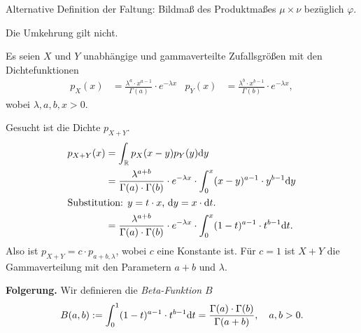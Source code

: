 Alternative Definition der Faltung: Bildmaß des Produktmaßes $\mu \times \nu$
bezüglich $\varphi$.

\begin{rmrk}
  Die Umkehrung gilt nicht.
\end{rmrk}

\begin{exmp}
  Es seien $X$ und $Y$ unabhängige und gammaverteilte Zufallsgrößen mit den
  Dichtefunktionen
  \begin{align*}
    p_X(x) &= \frac{\lambda^a \cdot x^{a-1}}{\Gamma(a)} \cdot e^{-\lambda x} &
    p_Y(x) &= \frac{\lambda^b \cdot x^{b-1}}{\Gamma(b)} \cdot e^{-\lambda x},
  \end{align*}
  wobei $\lambda, a, b, x > 0$.

  Gesucht ist die Dichte $p_{X+Y}$.
  \begin{align*}
    p_{X+Y}(x)
    &= \int_{\mathbb{R}} p_X(x-y) p_Y(y) \mathrm{d} y \\
    &= \frac{\lambda^{a+b}}{\Gamma(a) \cdot \Gamma(b)} \cdot e^{-\lambda x} \cdot \int_0^x (x-y)^{a-1} \cdot y^{b-1} \mathrm{d} y \\
    \intertext{Substitution: $y = t \cdot x$, $\mathrm{d} y = x \cdot \mathrm{d} t$.}
    &= \frac{\lambda^{a+b}}{\Gamma(a) \cdot \Gamma(b)} \cdot e^{-\lambda x} \cdot \int_0^x (1-t)^{a-1} \cdot t^{b-1} \mathrm{d} t.
  \end{align*}
  Also ist $p_{X+Y} = c \cdot p_{a+b,\lambda}$, wobei $c$ eine Konstante ist.
  Für $c=1$ ist $X+Y$ die Gammaverteilung mit den Parametern $a+b$ und
  $\lambda$.

  \textbf{Folgerung.} Wir definieren die \emph{Beta-Funktion} $B$
  \[ B(a,b) := \int_0^1 (1-t)^{a-1} \cdot t^{b-1} \mathrm{d} t = \frac{\Gamma(a)
      \cdot \Gamma(b)}{\Gamma(a+b)}, \quad a,b > 0. \]
\end{exmp}

